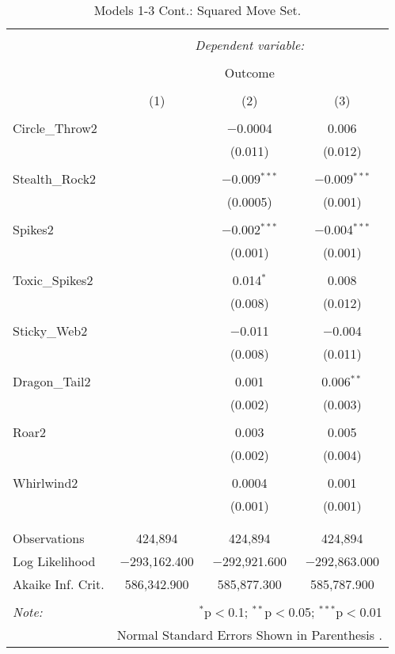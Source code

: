 \documentclass[12pt,twoside]{reedthesis}
\begin{document}
  \begin{table}[!htbp] \centering 
    \caption{Models 1-3 Cont.: Squared Move Set.} 
    \label{} 
  \begin{tabular}{@{\extracolsep{5pt}}lccc} 
  \\[-1.8ex]\hline 
  \hline \\[-1.8ex] 
   & \multicolumn{3}{c}{\textit{Dependent variable:}} \\ 
  \cline{2-4} 
  \\[-1.8ex] & \multicolumn{3}{c}{Outcome} \\ 
  \\[-1.8ex] & (1) & (2) & (3)\\ 
  \hline \\[-1.8ex] 
   Circle\_Throw2 &  & $-$0.0004 & 0.006 \\ 
    &  & (0.011) & (0.012) \\ 
    & & & \\ 
   Stealth\_Rock2 &  & $-$0.009$^{***}$ & $-$0.009$^{***}$ \\ 
    &  & (0.0005) & (0.001) \\ 
    & & & \\ 
   Spikes2 &  & $-$0.002$^{***}$ & $-$0.004$^{***}$ \\ 
    &  & (0.001) & (0.001) \\ 
    & & & \\ 
   Toxic\_Spikes2 &  & 0.014$^{*}$ & 0.008 \\ 
    &  & (0.008) & (0.012) \\ 
    & & & \\ 
   Sticky\_Web2 &  & $-$0.011 & $-$0.004 \\ 
    &  & (0.008) & (0.011) \\ 
    & & & \\ 
   Dragon\_Tail2 &  & 0.001 & 0.006$^{**}$ \\ 
    &  & (0.002) & (0.003) \\ 
    & & & \\ 
   Roar2 &  & 0.003 & 0.005 \\ 
    &  & (0.002) & (0.004) \\ 
    & & & \\ 
   Whirlwind2 &  & 0.0004 & 0.001 \\ 
    &  & (0.001) & (0.001) \\ 
    & & & \\ 
  \hline \\[-1.8ex] 
  Observations & 424,894 & 424,894 & 424,894 \\ 
  Log Likelihood & $-$293,162.400 & $-$292,921.600 & $-$292,863.000 \\ 
  Akaike Inf. Crit. & 586,342.900 & 585,877.300 & 585,787.900 \\ 
  \hline 
  \hline \\[-1.8ex] 
  \textit{Note:}  & \multicolumn{3}{r}{$^{*}$p$<$0.1; $^{**}$p$<$0.05; $^{***}$p$<$0.01} \\ 
   & \multicolumn{3}{r}{Normal Standard Errors Shown in Parenthesis .} \\ 
  \end{tabular} 
  \end{table}
  
\end{document}
